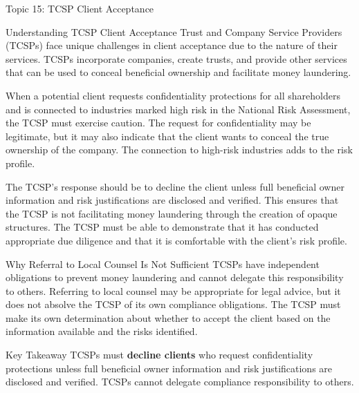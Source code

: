 \documentclass[5pt]{beamer}
\begin{document}
	\begin{frame}{Topic 15: TCSP Client Acceptance}
		\begin{block}{\tiny Understanding TCSP Client Acceptance}
			\tiny Trust and Company Service Providers (TCSPs) face unique challenges in client acceptance due to the nature of their services. TCSPs incorporate companies, create trusts, and provide other services that can be used to conceal beneficial ownership and facilitate money laundering.
			
			When a potential client requests confidentiality protections for all shareholders and is connected to industries marked high risk in the National Risk Assessment, the TCSP must exercise caution. The request for confidentiality may be legitimate, but it may also indicate that the client wants to conceal the true ownership of the company. The connection to high-risk industries adds to the risk profile.
			
			The TCSP's response should be to decline the client unless full beneficial owner information and risk justifications are disclosed and verified. This ensures that the TCSP is not facilitating money laundering through the creation of opaque structures. The TCSP must be able to demonstrate that it has conducted appropriate due diligence and that it is comfortable with the client's risk profile.
		\end{block}
		
		\begin{block}{\tiny Why Referral to Local Counsel Is Not Sufficient}
			\tiny TCSPs have independent obligations to prevent money laundering and cannot delegate this responsibility to others. Referring to local counsel may be appropriate for legal advice, but it does not absolve the TCSP of its own compliance obligations. The TCSP must make its own determination about whether to accept the client based on the information available and the risks identified.
		\end{block}
		
		\begin{alertblock}{Key Takeaway}
			\tiny TCSPs must \textbf{decline clients} who request confidentiality protections unless full beneficial owner information and risk justifications are disclosed and verified. TCSPs cannot delegate compliance responsibility to others.
		\end{alertblock}
	\end{frame}
	
\end{document}
